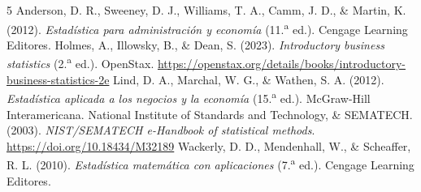 {\renewcommand{\bibsection}{\section*{Referencias}\addcontentsline{toc}{section}{Referencias}}
\setlength{\bibhang}{1.27cm}\setlength{\bibsep}{4pt}
\begin{thebibliography}{5}
Anderson, D. R., Sweeney, D. J., Williams, T. A., Camm, J. D., \& Martin, K. (2012). \textit{Estadística para administración y economía} (11.\textsuperscript{a} ed.). Cengage Learning Editores.
Holmes, A., Illowsky, B., \& Dean, S. (2023). \textit{Introductory business statistics} (2.\textsuperscript{a} ed.). OpenStax. \url{https://openstax.org/details/books/introductory-business-statistics-2e}
Lind, D. A., Marchal, W. G., \& Wathen, S. A. (2012). \textit{Estadística aplicada a los negocios y la economía} (15.\textsuperscript{a} ed.). McGraw-Hill Interamericana.
National Institute of Standards and Technology, \& SEMATECH. (2003). \textit{NIST/SEMATECH e-Handbook of statistical methods}. \url{https://doi.org/10.18434/M32189}
Wackerly, D. D., Mendenhall, W., \& Scheaffer, R. L. (2010). \textit{Estadística matemática con aplicaciones} (7.\textsuperscript{a} ed.). Cengage Learning Editores.
\end{thebibliography}
}

